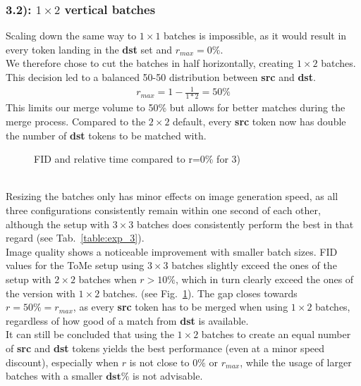 \subsubsection*{3.2): $1 \times 2$ vertical batches}
Scaling down the same way to $1 \times 1$ batches is impossible, as it would result in every token landing in the \textbf{dst} set and \(r_{max}=0\%\).\\
We therefore chose to cut the batches in half horizontally, creating $1 \times 2$ batches. This decision led to a balanced 50-50 distribution between \textbf{src} and \textbf{dst}.
\begin{align*}
    r_{max} = 1-\frac{1}{1*2} = 50\%
\end{align*}
This limits our merge volume to 50\% but allows for better matches during the merge process. Compared to the $2 \times 2$ default, every \textbf{src} token now has double the number of \textbf{dst} tokens to be matched with.\\
\begin{figure}[!htb]
    
    
\caption{FID and relative time compared to r=0\% for 3)}
\label{fig:exp_3}
\end{figure}\\
Resizing the batches only has minor effects on image generation speed, as all three configurations consistently remain within one second of each other, although the setup with $3 \times 3$ batches does consistently perform the best in that regard (see Tab.~\ref{table:exp_3}).\\
Image quality shows a noticeable improvement with smaller batch sizes. FID values for the ToMe setup using $3 \times 3$ batches slightly exceed the ones of the setup with $2 \times 2$ batches when \(r>10\%\), which in turn clearly exceed the ones of the version with $1 \times 2$ batches. (see Fig.~\ref{fig:exp_3}).
The gap closes towards \(r=50\%=r_{max}\), as every \textbf{src} token has to be merged when using $1 \times 2$ batches, regardless of how good of a match from \textbf{dst} is available.\\
It can still be concluded that using the $1 \times 2$ batches to create an equal number of \textbf{src} and \textbf{dst} tokens yields the best performance (even at a minor speed discount), especially when \(r\) is not close to \(0\%\) or \(r_{max}\), while the usage of larger batches with a smaller \(\textbf{dst\%}\) is not advisable.



